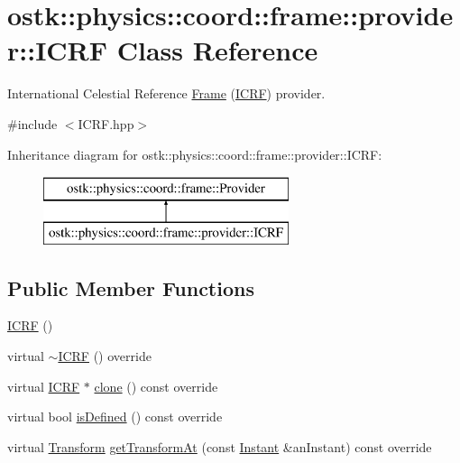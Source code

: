 \hypertarget{classostk_1_1physics_1_1coord_1_1frame_1_1provider_1_1_i_c_r_f}{}\section{ostk\+:\+:physics\+:\+:coord\+:\+:frame\+:\+:provider\+:\+:I\+C\+RF Class Reference}
\label{classostk_1_1physics_1_1coord_1_1frame_1_1provider_1_1_i_c_r_f}


International Celestial Reference \hyperlink{classostk_1_1physics_1_1coord_1_1_frame}{Frame} (\hyperlink{classostk_1_1physics_1_1coord_1_1frame_1_1provider_1_1_i_c_r_f}{I\+C\+RF}) provider.  




{\ttfamily \#include $<$I\+C\+R\+F.\+hpp$>$}

Inheritance diagram for ostk\+:\+:physics\+:\+:coord\+:\+:frame\+:\+:provider\+:\+:I\+C\+RF\+:\begin{figure}[H]
\begin{center}
\leavevmode
\includegraphics[height=2.000000cm]{classostk_1_1physics_1_1coord_1_1frame_1_1provider_1_1_i_c_r_f}
\end{center}
\end{figure}
\subsection*{Public Member Functions}
\begin{DoxyCompactItemize}
\item 
\hyperlink{classostk_1_1physics_1_1coord_1_1frame_1_1provider_1_1_i_c_r_f_a4ee5db5699238f12a9846f4440c6b926}{I\+C\+RF} ()
\item 
virtual \hyperlink{classostk_1_1physics_1_1coord_1_1frame_1_1provider_1_1_i_c_r_f_a9466870694d2b16fc116b1df36675dbc}{$\sim$\+I\+C\+RF} () override
\item 
virtual \hyperlink{classostk_1_1physics_1_1coord_1_1frame_1_1provider_1_1_i_c_r_f}{I\+C\+RF} $\ast$ \hyperlink{classostk_1_1physics_1_1coord_1_1frame_1_1provider_1_1_i_c_r_f_a40f7812d39719db68178ab6850a5cdde}{clone} () const override
\item 
virtual bool \hyperlink{classostk_1_1physics_1_1coord_1_1frame_1_1provider_1_1_i_c_r_f_a0d8e56478597e46dbc2c1867e6774398}{is\+Defined} () const override
\item 
virtual \hyperlink{classostk_1_1physics_1_1coord_1_1_transform}{Transform} \hyperlink{classostk_1_1physics_1_1coord_1_1frame_1_1provider_1_1_i_c_r_f_ab8d3ba4c098340eb43583e80cb5dd826}{get\+Transform\+At} (const \hyperlink{classostk_1_1physics_1_1time_1_1_instant}{Instant} \&an\+Instant) const override
\end{DoxyCompactItemize}


